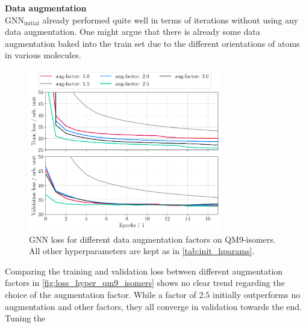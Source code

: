 \textbf{Data augmentation}\\
$\text{GNN}_\text{initial}$ already performed quite well in terms of iterations without using any data augmentation. One might argue that there is already some data augmentation baked into the train set due to the different orientations of atoms in various molecules. 
\begin{figure}[h]
    \centering
    \includegraphics[width=0.75\textwidth]{../fig/application/aug_train_val_loss.pdf}
    \caption[GNN loss different augmentation factors | QM9-isomers]{GNN loss for different data augmentation factors on QM9-isomers. All other hyperparameters are kept as in \autoref{tab:init_hparams}.}
    \label{fig:loss_hyper_qm9_isomers}
\end{figure}
Comparing the training and validation loss between different augmentation factors in \autoref{fig:loss_hyper_qm9_isomers} shows no clear trend regarding the choice of the augmentation factor. While a factor of $2.5$ initially outperforms no augmentation and other factors, they all converge in validation towards the end. 
Tuning the 

